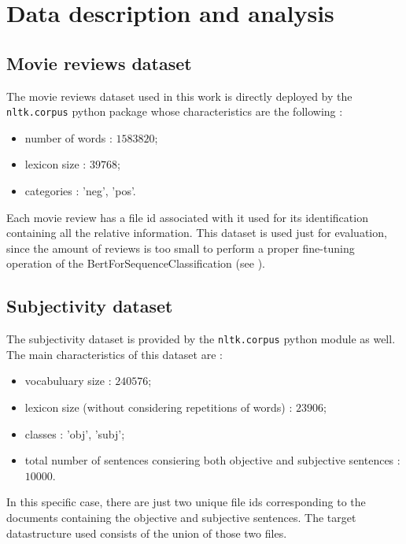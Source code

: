 
\section{Data description and analysis}
\label{sec:data} 
\subsection{Movie reviews dataset}
\label{subsec:mr}
The movie reviews dataset used in this work is directly deployed by the \texttt{nltk.corpus} python package whose characteristics are the following :
\begin{itemize}
    \item number of words : $1583820$;
    \item lexicon size : $39768$;
    \item categories : 'neg', 'pos'.
\end{itemize}
Each movie review has a file id associated with it used for its identification containing all the relative information.
This dataset is used just for evaluation, since the amount of reviews is too small to perform a proper fine-tuning operation of the BertForSequenceClassification (see 
\textbf{}).

\subsection{Subjectivity dataset}
\label{subsec:subj}
The subjectivity dataset is provided by the \texttt{nltk.corpus} python module as well.\\ 
The main characteristics of this dataset are :
\begin{itemize}
    \item vocabuluary size : $240576$;
    \item lexicon size (without considering repetitions of words) : $23906$;
    \item classes : 'obj', 'subj';
    \item total number of sentences consiering both objective and subjective sentences : $10000$.
\end{itemize}
In this specific case, there are just two unique file ids corresponding to the documents containing the objective and subjective sentences. The target datastructure used 
consists of the union of those two files.

